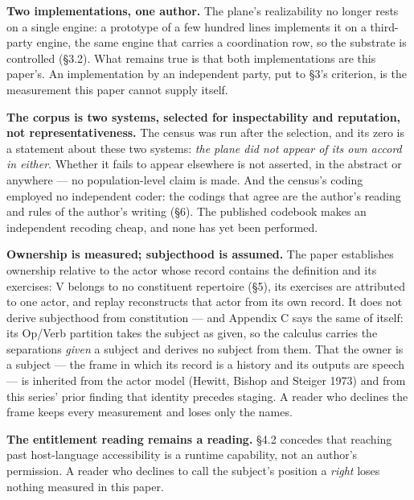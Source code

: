 \documentclass[
]{article}
\newcounter{none} %
\begin{document}
\textbf{Two implementations, one author.} The plane's realizability no
longer rests on a single engine: a prototype of a few hundred lines
implements it on a third-party engine, the same engine that carries a
coordination row, so the substrate is controlled (§3.2). What remains
true is that both implementations are this paper's. An implementation by
an independent party, put to §3's criterion, is the measurement this
paper cannot supply itself.

\textbf{The corpus is two systems, selected for inspectability and
reputation, not representativeness.} The census was run after the
selection, and its zero is a statement about these two systems:
\emph{the plane did not appear of its own accord in either}. Whether it
fails to appear elsewhere is not asserted, in the abstract or anywhere
--- no population-level claim is made. And the census's coding employed
no independent coder: the codings that agree are the author's reading
and rules of the author's writing (§6). The published codebook makes an
independent recoding cheap, and none has yet been performed.

\textbf{Ownership is measured; subjecthood is assumed.} The paper
establishes ownership relative to the actor whose record contains the
definition and its exercises: V belongs to no constituent repertoire
(§5), its exercises are attributed to one actor, and replay reconstructs
that actor from its own record. It does not derive subjecthood from
constitution --- and Appendix C says the same of itself: its Op/Verb
partition takes the subject as given, so the calculus carries the
separations \emph{given} a subject and derives no subject from them.
That the owner is a subject --- the frame in which its record is a
history and its outputs are speech --- is inherited from the actor model
(Hewitt, Bishop and Steiger 1973) and from this series' prior finding
that identity precedes staging. A reader who declines the frame keeps
every measurement and loses only the names.

\textbf{The entitlement reading remains a reading.} §4.2 concedes that
reaching past host-language accessibility is a runtime capability, not
an author's permission. A reader who declines to call the subject's
position a \emph{right} loses nothing measured in this paper.
\end{document}
